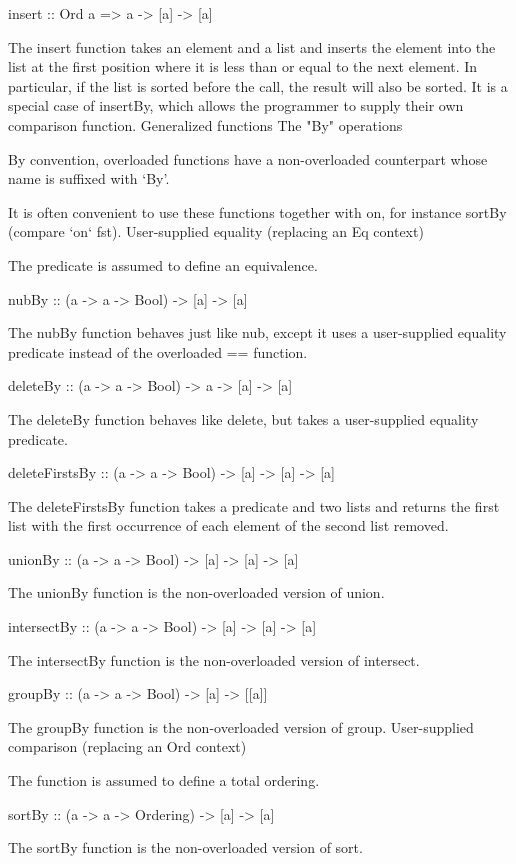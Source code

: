 insert :: Ord a => a -> [a] -> [a]

The insert function takes an element and a list and inserts the element into the list at the first position where it is less than or equal to the next element. In particular, if the list is sorted before the call, the result will also be sorted. It is a special case of insertBy, which allows the programmer to supply their own comparison function.
Generalized functions
The "By" operations

By convention, overloaded functions have a non-overloaded counterpart whose name is suffixed with `By'.

It is often convenient to use these functions together with on, for instance sortBy (compare `on` fst).
User-supplied equality (replacing an Eq context)

The predicate is assumed to define an equivalence.

nubBy :: (a -> a -> Bool) -> [a] -> [a]

The nubBy function behaves just like nub, except it uses a user-supplied equality predicate instead of the overloaded == function.

deleteBy :: (a -> a -> Bool) -> a -> [a] -> [a]

The deleteBy function behaves like delete, but takes a user-supplied equality predicate.

deleteFirstsBy :: (a -> a -> Bool) -> [a] -> [a] -> [a]

The deleteFirstsBy function takes a predicate and two lists and returns the first list with the first occurrence of each element of the second list removed.

unionBy :: (a -> a -> Bool) -> [a] -> [a] -> [a]

The unionBy function is the non-overloaded version of union.

intersectBy :: (a -> a -> Bool) -> [a] -> [a] -> [a]

The intersectBy function is the non-overloaded version of intersect.

groupBy :: (a -> a -> Bool) -> [a] -> [[a]]

The groupBy function is the non-overloaded version of group.
User-supplied comparison (replacing an Ord context)

The function is assumed to define a total ordering.

sortBy :: (a -> a -> Ordering) -> [a] -> [a]

The sortBy function is the non-overloaded version of sort.


